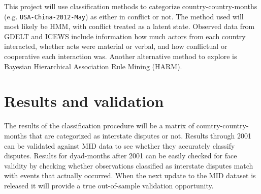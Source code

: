 \documentclass[twoside]{article}
\begin{document}

This project will use classification methods to categorize country-country-months (e.g. \texttt{USA-China-2012-May}) as either in conflict or not. The method used will most likely be HMM, with conflict treated as a latent state. Observed data from GDELT and ICEWS include information how much actors from each country interacted, whether acts were material or verbal, and how conflictual or cooperative each interaction was. Another alternative method to explore is Bayesian Hierarchical Association Rule Mining (HARM). 


\section{Results and validation}


The results of the classification procedure will be a matrix of country-country-months that are categorized as interstate disputes or not. Results through 2001 can be validated against MID data to see whether they accurately classify disputes. Results for dyad-months after 2001 can be easily checked for face validity by checking whether observations classified as interstate disputes match with events that actually occurred. When the next update to the MID dataset is released it will provide a true out-of-sample validation opportunity. 

\end{document}
